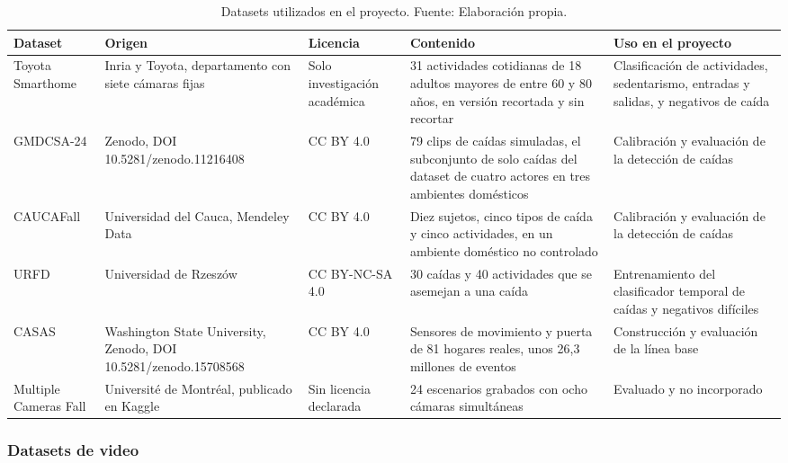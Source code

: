 \begin{table}[H]
\centering
\caption[Datasets utilizados en el proyecto.]{Datasets utilizados en el proyecto. Fuente: Elaboración propia.}
\label{tab:datasets}
\footnotesize
\begin{tabular}{@{}p{2.3cm}p{2.8cm}p{1.9cm}p{3.9cm}p{3.2cm}@{}}
\toprule
\textbf{Dataset} & \textbf{Origen} & \textbf{Licencia} & \textbf{Contenido} & \textbf{Uso en el proyecto} \\
\midrule
Toyota Smarthome \parencite{Das2019} & Inria y Toyota, departamento con siete cámaras fijas & Solo investigación académica & 31 actividades cotidianas de 18 adultos mayores de entre 60 y 80 años, en versión recortada y sin recortar & Clasificación de actividades, sedentarismo, entradas y salidas, y negativos de caída \\
GMDCSA-24 \parencite{Alam2024} & Zenodo, DOI 10.5281/zenodo.11216408 & CC BY 4.0 & 79 clips de caídas simuladas, el subconjunto de solo caídas del dataset de cuatro actores en tres ambientes domésticos & Calibración y evaluación de la detección de caídas \\
CAUCAFall \parencite{Eraso2022} & Universidad del Cauca, Mendeley Data & CC BY 4.0 & Diez sujetos, cinco tipos de caída y cinco actividades, en un ambiente doméstico no controlado & Calibración y evaluación de la detección de caídas \\
URFD \parencite{Kwolek2014} & Universidad de Rzeszów & CC BY-NC-SA 4.0 & 30 caídas y 40 actividades que se asemejan a una caída & Entrenamiento del clasificador temporal de caídas y negativos difíciles \\
CASAS \parencite{Cook2013} & Washington State University, Zenodo, DOI 10.5281/zenodo.15708568 & CC BY 4.0 & Sensores de movimiento y puerta de 81 hogares reales, unos 26,3 millones de eventos & Construcción y evaluación de la línea base \\
Multiple Cameras Fall \parencite{Auvinet2011} & Université de Montréal, publicado en Kaggle & Sin licencia declarada & 24 escenarios grabados con ocho cámaras simultáneas & Evaluado y no incorporado \\
\bottomrule
\end{tabular}
\end{table}

\subsubsection*{Datasets de video}

